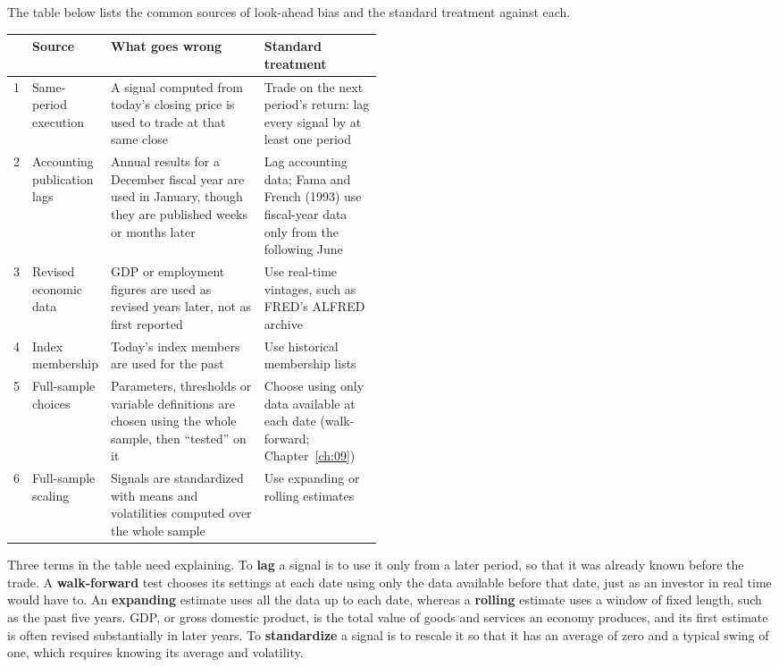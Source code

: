 The table below lists the common sources of look-ahead bias and the standard treatment against each.

\begin{center}
\small
\begin{tabularx}{0.9\linewidth}{@{}r>{\raggedright\arraybackslash}p{0.16\linewidth}>{\raggedright\arraybackslash}X>{\raggedright\arraybackslash}p{0.32\linewidth}@{}}
\toprule
 & Source & What goes wrong & Standard treatment \\
\midrule
1 & Same-period execution & A signal computed from today's closing price is used to trade at that same close & Trade on the next period's return: lag every signal by at least one period \\
2 & Accounting publication lags & Annual results for a December fiscal year are used in January, though they are published weeks or months later & Lag accounting data; Fama and French (1993) use fiscal-year data only from the following June \\
3 & Revised economic data & GDP or employment figures are used as revised years later, not as first reported & Use real-time vintages, such as FRED's ALFRED archive \\
4 & Index membership & Today's index members are used for the past & Use historical membership lists \\
5 & Full-sample choices & Parameters, thresholds or variable definitions are chosen using the whole sample, then ``tested'' on it & Choose using only data available at each date (walk-forward; Chapter~\ref{ch:09}) \\
6 & Full-sample scaling & Signals are standardized with means and volatilities computed over the whole sample & Use expanding or rolling estimates \\
\bottomrule
\end{tabularx}
\end{center}


Three terms in the table need explaining. To \textbf{lag} a signal is to use it only from a later period, so that it was already known before the trade. A \textbf{walk-forward} test chooses its settings at each date using only the data available before that date, just as an investor in real time would have to. An \textbf{expanding} estimate uses all the data up to each date, whereas a \textbf{rolling} estimate uses a window of fixed length, such as the past five years. GDP, or gross domestic product, is the total value of goods and services an economy produces, and its first estimate is often revised substantially in later years. To \textbf{standardize} a signal is to rescale it so that it has an average of zero and a typical swing of one, which requires knowing its average and volatility.

